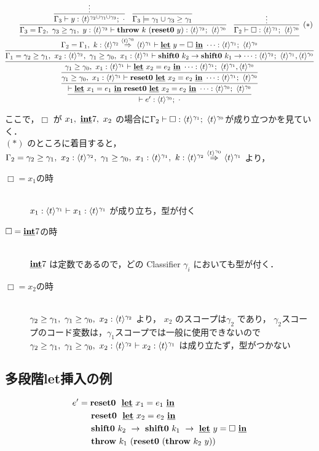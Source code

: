 \def\proofthree{
  {\infer{\Gamma_2=\Gamma_1,~k:\contT{\ttwo}{\tone}{\tzero}
      \vdash \cLet~y=\Box~\cIn~\cdots : \tone;~\tzero
    }
    {\prooffour}
  }
}

\def\prooffour{
  \infer{\Gamma_3=\Gamma_2,~\longer{\gamma_3}{\gamma_1},~y:\tthree \vdash \throw{k}{(\Resetz~ y)} :
    \tthree;~\tzero}
  {\infer{\Gamma_3 \vdash y : \tall;~\cdot}{\vdots}
    & \infer{\Gamma_3 \models \longer{\gamma_1\uni\gamma_3}{\gamma_1}}{}
  }
  & \infer[(*)]{\Gamma_2 \vdash \Box : \tone;~ \tzero}{\vdots}
}

\[
  \proofone
\]

ここで，$\Box$ が $x_1,~ \underline{\textbf{int}} 7,~ x_2$ の場合に$\Gamma_2 \vdash \Box : \langle{t}\rangle^{\gamma_1};~ \langle{t}\rangle^{\gamma_0}$が成り立つかを見ていく．\\
$(*)$ のところに着目すると，
$\Gamma_2 = {\gamma_2} \ge {\gamma_1},~x_2:\langle{t}\rangle^{\gamma_2},~{\gamma_1} \ge {\gamma_0},~x_1:\langle{t}\rangle^{\gamma_1},~k:{\langle{t}\rangle^{\gamma_2}} \stackrel{\langle{t}\rangle^{\gamma_0}}{\Rightarrow} {\langle{t}\rangle^{\gamma_1}}$
より，
\begin{description}
\item[$\Box=x_1$の時]\mbox{}\\
  $x_1:\langle{t}\rangle^{\gamma_1} \vdash x_1:\langle{t}\rangle^{\gamma_1}$ が成り立ち，型が付く
\item[$\Box= \underline{\textbf{int}} 7$の時]\mbox{}\\
  $\underline{\textbf{int}} 7$ は定数であるので，どの Classifier $\gamma_i$ においても型が付く．
\item[$\Box=x_2$の時]\mbox{}\\
  ${\gamma_2} \ge {\gamma_1},~{\gamma_1} \ge {\gamma_0},~x_2:\langle{t}\rangle^{\gamma_2}$ より，
  $x_2$ のスコープは$\gamma_2$ であり，
  $\gamma_2$スコープのコード変数は，$\gamma_1$スコープでは一般に使用できないので
  ${\gamma_2} \ge {\gamma_1},~{\gamma_1} \ge {\gamma_0},~x_2:\langle{t}\rangle^{\gamma_2} \vdash x_2:\langle{t}\rangle^{\gamma_1}$ は成り立たず，型がつかない
\end{description}

\subsection{多段階let挿入の例}

\begin{align*}
  e' & = \textbf{reset0} ~~\underline{\textbf{let}}~x_1= e_1~\underline{\textbf{in}} \\
      & \phantom{=}~~ \textbf{reset0} ~~\underline{\textbf{let}}~x_2=e_2~\underline{\textbf{in}} \\
      & \phantom{=}~~ \textbf{shift0}~k_2~\to~ \textbf{shift0}~k_1~\to~ \underline{\textbf{let}}~y=\Box~\underline{\textbf{in}} \\
      & \phantom{=}~~ \textbf{throw}~k_1~ (\textbf{reset0}~ (\textbf{throw}~k_2~ y))
\end{align*}

